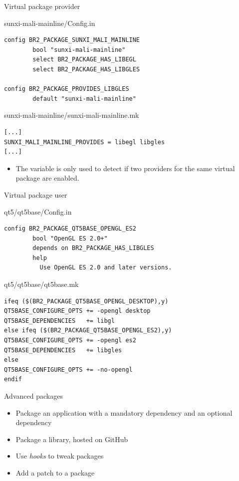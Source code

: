 \begin{frame}[fragile]{Virtual package provider}

\begin{block}{sunxi-mali-mainline/Config.in}
{\small
\begin{verbatim}
config BR2_PACKAGE_SUNXI_MALI_MAINLINE
        bool "sunxi-mali-mainline"
        select BR2_PACKAGE_HAS_LIBEGL
        select BR2_PACKAGE_HAS_LIBGLES

config BR2_PACKAGE_PROVIDES_LIBGLES
        default "sunxi-mali-mainline"
\end{verbatim}}
\end{block}

\begin{block}{sunxi-mali-mainline/sunxi-mali-mainline.mk}
\begin{verbatim}
[...]
SUNXI_MALI_MAINLINE_PROVIDES = libegl libgles
[...]
\end{verbatim}
\end{block}

\begin{itemize}
\item The variable  is only used to detect if two
  providers for the same virtual package are enabled.
\end{itemize}

\end{frame}

\begin{frame}[fragile]{Virtual package user}

  \begin{block}{qt5/qt5base/Config.in}
{\small
\begin{verbatim}
config BR2_PACKAGE_QT5BASE_OPENGL_ES2
        bool "OpenGL ES 2.0+"
        depends on BR2_PACKAGE_HAS_LIBGLES
        help
          Use OpenGL ES 2.0 and later versions.
\end{verbatim}}
\end{block}

\begin{block}{qt5/qt5base/qt5base.mk}
\begin{verbatim}
ifeq ($(BR2_PACKAGE_QT5BASE_OPENGL_DESKTOP),y)
QT5BASE_CONFIGURE_OPTS += -opengl desktop
QT5BASE_DEPENDENCIES   += libgl
else ifeq ($(BR2_PACKAGE_QT5BASE_OPENGL_ES2),y)
QT5BASE_CONFIGURE_OPTS += -opengl es2
QT5BASE_DEPENDENCIES   += libgles
else
QT5BASE_CONFIGURE_OPTS += -no-opengl
endif
\end{verbatim}
\end{block}

\end{frame}

\setuplabframe
{Advanced packages}
{
  \begin{itemize}
  \item Package an application with a mandatory dependency and an
    optional dependency
  \item Package a library, hosted on GitHub
  \item Use {\em hooks} to tweak packages
  \item Add a patch to a package
  \end{itemize}
}
